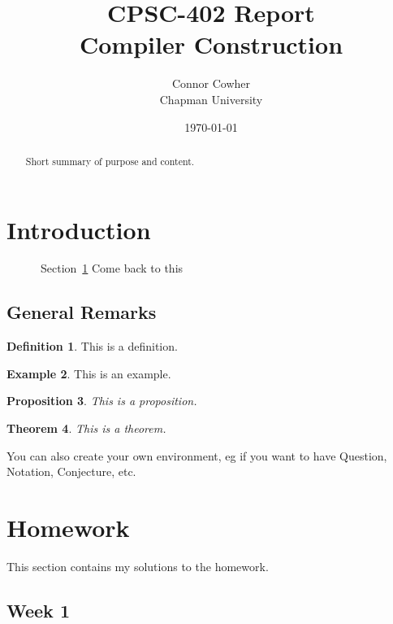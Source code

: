 \documentclass{article}
\title{CPSC-402 Report\\Compiler Construction}
\author{Connor Cowher  \\ Chapman University}
\date{\today}
\theoremstyle{theorem}
\newtheorem{theorem}{Theorem}[section]
\newtheorem{proposition}[theorem]{Proposition}
\theoremstyle{definition}
\newtheorem{definition}[theorem]{Definition}
\newtheorem{example}[theorem]{Example}
\theoremstyle{remark}
\begin{document}
\maketitle

\begin{abstract}
Short  summary of purpose and content.  
\end{abstract}
\clearpage

\tableofcontents
\clearpage

\section{Introduction}\label{intro}

~~~~~~Section~\ref{intro} Come back to this~~~~~~

\subsection{General Remarks}
\medskip\noindent

\begin{definition} 
This is a definition.
\end{definition}

\begin{example}
This is an example.
\end{example}

\begin{proposition}
This is a proposition.
\end{proposition}

\begin{theorem}
This is a theorem.
\end{theorem}

\noindent You can also create your own environment, eg if you want to have Question, Notation, Conjecture, etc.

\section{Homework}\label{homework}

This section contains my solutions to the homework. 

\subsection{Week 1}
\end{document}
